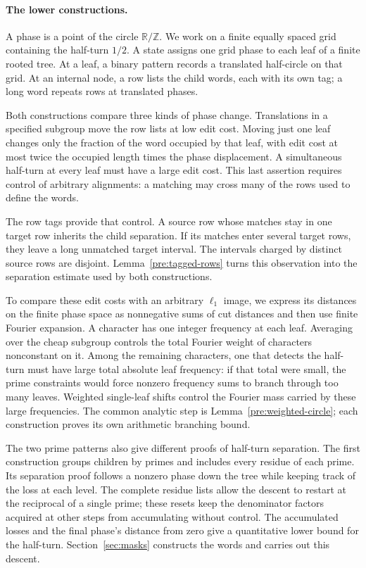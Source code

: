 \paragraph{The lower constructions.}
A phase is a point of the circle $\mathbb R/\mathbb Z$. We work on a finite
equally spaced grid containing the half-turn $1/2$. A state assigns one grid
phase to each leaf of a finite rooted tree. At a leaf, a binary pattern
records a translated half-circle on that grid. At an internal node, a row
lists the child words, each with its own tag; a long word repeats rows at
translated phases.

Both constructions compare three kinds of phase change. Translations in a
specified subgroup move the row lists at low edit cost. Moving just one
leaf changes only the fraction of the word occupied by that leaf, with
edit cost at most twice the occupied length times the phase displacement.
A simultaneous half-turn at every leaf must have a large edit cost. This last
assertion requires control of arbitrary alignments: a matching may cross
many of the rows used to define the words.

The row tags provide that control. A source row whose matches stay in one
target row inherits the child separation. If its matches enter several
target rows, they leave a long unmatched target interval. The intervals
charged by distinct source rows are disjoint. Lemma~\ref{pre:tagged-rows}
turns this observation into the separation estimate used by both
constructions.

To compare these edit costs with an arbitrary $\ell_1$ image, we express
its distances on the finite phase space as nonnegative sums of cut distances
and then use finite Fourier expansion. A character has one integer frequency
at each leaf. Averaging over the cheap subgroup controls the total Fourier
weight of characters nonconstant on it. Among the remaining characters,
one that detects the half-turn must have large total absolute leaf
frequency: if that total were small, the prime constraints would force
nonzero frequency sums to branch through too many leaves. Weighted
single-leaf shifts control the Fourier mass carried by these large
frequencies.
The common analytic step is Lemma~\ref{pre:weighted-circle}; each construction proves
its own arithmetic branching bound.

The two prime patterns also give different proofs of half-turn separation.
The first construction groups children by primes and includes every residue
of each prime. Its separation proof follows a nonzero phase down the tree
while keeping track of the loss at each level. The complete residue lists
allow the descent to restart at the reciprocal of a single prime; these
resets keep the denominator factors acquired at other steps from
accumulating without control. The accumulated losses and the final phase's
distance from zero give a quantitative lower bound for the half-turn.
Section~\ref{sec:masks} constructs the words and carries out this descent.

